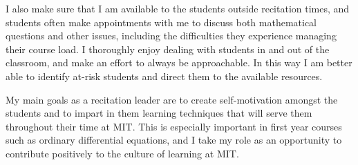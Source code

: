 \documentclass[11pt]{article}
\begin{document}
I also make sure that I am available to the students outside recitation times, and students often make appointments with me to discuss both mathematical questions and other issues, including the difficulties they experience managing their course load. I thoroughly enjoy dealing with students in and out of the classroom, and make an effort to always be approachable. In this way I am better able to identify at-risk students and direct them to the available resources.

My main goals as a recitation leader are to create self-motivation amongst the students and to impart in them learning techniques that will serve them throughout their time at MIT. This is especially important in first year courses such as ordinary differential equations, and I take my role as an opportunity to contribute positively to the culture of learning at MIT.
\end{document}
